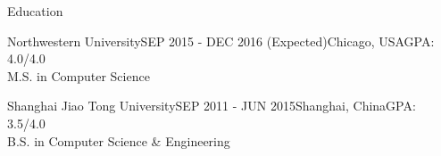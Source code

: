 \documentclass{resume} %
\begin{document}
\vspace{10pt}

\begin{rSection}{Education}
\begin{rSubsection}{Northwestern University}{SEP 2015 - DEC 2016 (Expected)}{Chicago, USA\quad GPA:  \textsc{4.0/4.0}}\\
M.S. in Computer Science
\end{rSubsection}
\vspace{5pt}
\begin{rSubsection}{Shanghai Jiao Tong University}{SEP 2011 - JUN 2015}{Shanghai, China\quad GPA:  \textsc{3.5/4.0}}\\
B.S. in Computer Science \& Engineering
\end{rSubsection}
\end{rSection}

\vspace{10pt}
\end{document}

